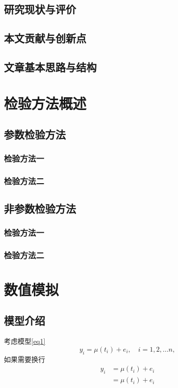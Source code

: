 \documentclass{SUFEThesis}
\begin{document}
\subsection{研究现状与评价}


\subsection{本文贡献与创新点}

\subsection{文章基本思路与结构}


\section{检验方法概述}

\subsection{参数检验方法}

\subsubsection{检验方法一}
\subsubsection{检验方法二}

\subsection{非参数检验方法}

\subsubsection{检验方法一}
\subsubsection{检验方法二}

\section{数值模拟}
\subsection{模型介绍}
考虑模型\eqref{eq1}
\begin{equation}
y_i = \mu(t_i) + e_i, \quad i = 1,2,\dots n,
\label{eq1}
\end{equation}
如果需要换行
\begin{equation}
  \begin{aligned}
  y_i &= \mu(t_i) + e_i\\
      &= \mu(t_i) + e_i\\
  \end{aligned}
\end{equation}
\end{document}
